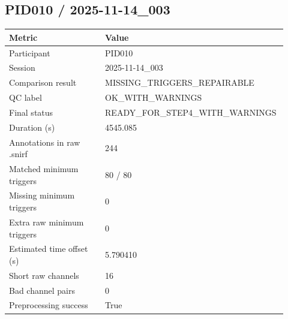 \subsection*{PID010 / 2025-11-14\_003}
\begin{tabular}{p{0.34\linewidth}p{0.58\linewidth}}
\toprule
Metric & Value\\
\midrule
Participant & PID010\\
Session & 2025-11-14\_003\\
Comparison result & MISSING\_TRIGGERS\_REPAIRABLE\\
QC label & OK\_WITH\_WARNINGS\\
Final status & READY\_FOR\_STEP4\_WITH\_WARNINGS\\
Duration (s) & 4545.085\\
Annotations in raw .snirf & 244\\
Matched minimum triggers & 80 / 80\\
Missing minimum triggers & 0\\
Extra raw minimum triggers & 0\\
Estimated time offset (s) & 5.790410\\
Short raw channels & 16\\
Bad channel pairs & 0\\
Preprocessing success & True\\
\bottomrule
\end{tabular}
